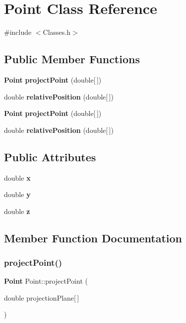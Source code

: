 \section{Point Class Reference}
\label{class_point}


{\ttfamily \#include $<$Classes.\+h$>$}

\subsection*{Public Member Functions}
\begin{DoxyCompactItemize}
\item 
\textbf{ Point} \textbf{ project\+Point} (double[$\,$])
\item 
double \textbf{ relative\+Position} (double[$\,$])
\item 
\textbf{ Point} \textbf{ project\+Point} (double[$\,$])
\item 
double \textbf{ relative\+Position} (double[$\,$])
\end{DoxyCompactItemize}
\subsection*{Public Attributes}
\begin{DoxyCompactItemize}
\item 
double \textbf{ x}
\item 
double \textbf{ y}
\item 
double \textbf{ z}
\end{DoxyCompactItemize}


\subsection{Member Function Documentation}
\mbox{\label{class_point_a209c076529495ad94cf65b8a71d29913}} 
\subsubsection{project\+Point()\hspace{0.1cm}{\footnotesize\ttfamily [1/2]}}
{\footnotesize\ttfamily \textbf{ Point} Point\+::project\+Point (\begin{DoxyParamCaption}\item[{double}]{projection\+Plane[$\,$] }\end{DoxyParamCaption})}

